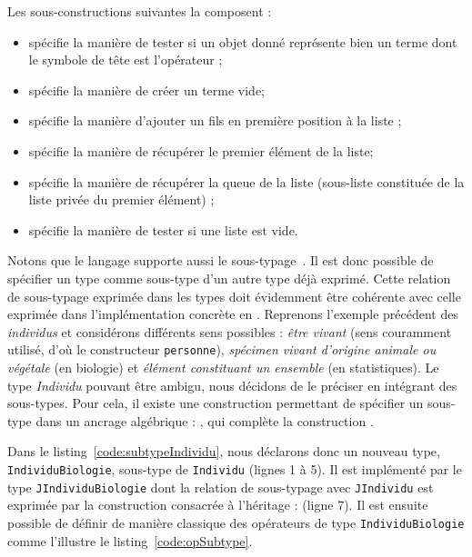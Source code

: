 Les sous-constructions suivantes la composent :
\begin{itemize}
  \item {} spécifie la manière de tester si un objet donné
    représente bien un terme dont le symbole de tête est l'opérateur ;
  \item {} spécifie la manière de créer un terme vide;
  \item {} spécifie la manière d'ajouter un fils en
    première position à la liste ;
  \item {} spécifie la manière de récupérer le premier élément de
    la liste;
  \item {} spécifie la manière de récupérer la queue de la liste
    (sous-liste constituée de la liste privée du premier élément) ;
  \item {} spécifie la manière de tester si une liste est vide.
\end{itemize}


Notons que le langage {\tom} supporte aussi le
sous-typage~\cite{tavares09,Tavares2012}. Il est donc possible de spécifier un
type comme sous-type d'un autre type déjà exprimé. Cette relation de
sous-typage exprimée dans les types {\tom} doit évidemment être cohérente avec
celle exprimée dans l'implémentation concrète en {\java}. Reprenons l'exemple
précédent des \emph{individus} et considérons différents sens possibles :
\emph{être vivant} (sens couramment utilisé, d'où le constructeur
\texttt{personne}), \emph{spécimen vivant d'origine animale ou végétale} (en
biologie) et \emph{élément constituant un ensemble} (en statistiques). Le type
\emph{Individu} pouvant être ambigu, nous décidons de le préciser en intégrant
des sous-types. Pour cela, il existe une construction {\tom} permettant de
spécifier un sous-type dans un ancrage algébrique : , qui complète
la construction .



Dans le listing~\ref{code:subtypeIndividu}, nous déclarons donc un nouveau
type, \texttt{IndividuBiologie}, sous-type de \texttt{Individu} (lignes 1 à 5).
Il est implémenté par le type {\java} \texttt{JIndividuBiologie} dont la
relation de sous-typage avec \texttt{JIndividu} est exprimée par la
construction {\java} consacrée à l'héritage :  (ligne 7). Il est
ensuite possible de définir de manière classique des opérateurs de type
\texttt{IndividuBiologie} comme l'illustre le listing~\ref{code:opSubtype}.

